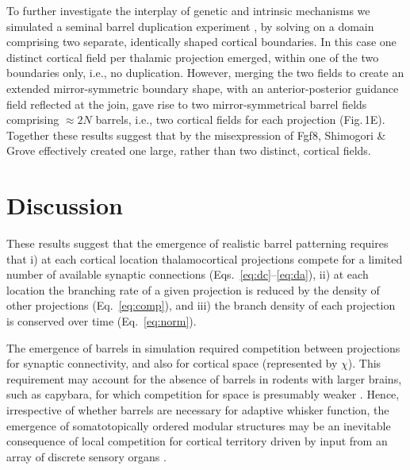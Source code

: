 \documentclass[9pt,twocolumn,twoside,lineno]{pnas-new}
\begin{document}
To further investigate the interplay of genetic and intrinsic mechanisms we
simulated a seminal barrel duplication experiment
\cite{shimogori_fibroblast_2005}, by solving on a domain comprising two
separate, identically shaped cortical boundaries. In this case one distinct
cortical field per thalamic projection emerged, within one of the two
boundaries only, i.e., no duplication. However, merging the two fields to
create an extended mirror-symmetric boundary shape, with an anterior-posterior
guidance field reflected at the join, gave rise to two mirror-symmetrical
barrel fields comprising $\approx 2N$ barrels, i.e., two cortical fields for
each projection (Fig.\,1E). Together these results suggest that by the
misexpression of Fgf8, Shimogori \& Grove \citep{shimogori_fibroblast_2005}
effectively created one large, rather than two distinct, cortical fields.

%

\section*{Discussion}

These results suggest that the emergence of realistic barrel patterning
requires that i) at each cortical location thalamocortical projections compete
for a limited number of available synaptic connections
(Eqs.~\ref{eq:dc}--\ref{eq:da}), ii) at each location the branching rate of a
given projection is reduced by the density of other projections
(Eq.~\ref{eq:comp}), and iii) the branch density of each projection is
conserved over time (Eq.~\ref{eq:norm}).

The emergence of barrels in simulation required competition between
projections for synaptic connectivity, and also for cortical space
(represented by $\chi$). This requirement may account for the absence of
barrels in rodents with larger brains, such as capybara, for which competition
for space is presumably weaker \citep{Woolsey1975}. Hence, irrespective of
whether barrels are necessary for adaptive whisker function, the emergence of
somatotopically ordered modular structures may be an inevitable consequence of
local competition for cortical territory driven by input from an array of
discrete sensory organs \citep{purves_iterated_1992}.
\end{document}

